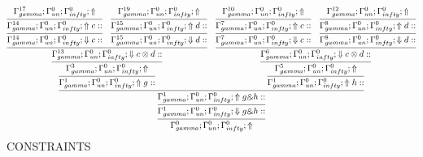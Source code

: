 \documentclass[a4paper, 11pt]{article}
\begin{document}
\[
\infer{\Gamma_{ gamma}^{0} ; \Gamma_{un}^{0} ; \Gamma_{ infty}^{0} ;  \Uparrow }
{\infer{\Gamma_{ gamma}^{1} ; \Gamma_{un}^{0} ; \Gamma_{ infty}^{0} ;  \Downarrow g \binampersand h :: }
{\infer{\Gamma_{ gamma}^{1} ; \Gamma_{un}^{0} ; \Gamma_{ infty}^{0} ;  \Uparrow g \binampersand h :: }
{\infer{\Gamma_{ gamma}^{1} ; \Gamma_{un}^{0} ; \Gamma_{ infty}^{0} ;  \Uparrow g :: }
{\infer{\Gamma_{ gamma}^{3} ; \Gamma_{un}^{0} ; \Gamma_{ infty}^{0} ;  \Uparrow }
{\infer{\Gamma_{ gamma}^{13} ; \Gamma_{un}^{0} ; \Gamma_{ infty}^{0} ;  \Downarrow c \otimes d :: }
{\infer{\Gamma_{ gamma}^{14} ; \Gamma_{un}^{0} ; \Gamma_{ infty}^{0} ;  \Downarrow c :: }
{\infer{\Gamma_{ gamma}^{14} ; \Gamma_{un}^{0} ; \Gamma_{ infty}^{0} ;  \Uparrow c :: }
{\Gamma_{ gamma}^{17} ; \Gamma_{un}^{0} ; \Gamma_{ infty}^{0} ;  \Uparrow }}
&
\infer{\Gamma_{ gamma}^{15} ; \Gamma_{un}^{0} ; \Gamma_{ infty}^{0} ;  \Downarrow d :: }
{\infer{\Gamma_{ gamma}^{15} ; \Gamma_{un}^{0} ; \Gamma_{ infty}^{0} ;  \Uparrow d :: }
{\Gamma_{ gamma}^{19} ; \Gamma_{un}^{0} ; \Gamma_{ infty}^{0} ;  \Uparrow }}}}}
&
\infer{\Gamma_{ gamma}^{1} ; \Gamma_{un}^{0} ; \Gamma_{ infty}^{0} ;  \Uparrow h :: }
{\infer{\Gamma_{ gamma}^{5} ; \Gamma_{un}^{0} ; \Gamma_{ infty}^{0} ;  \Uparrow }
{\infer{\Gamma_{ gamma}^{6} ; \Gamma_{un}^{0} ; \Gamma_{ infty}^{0} ;  \Downarrow c \otimes d :: }
{\infer{\Gamma_{ gamma}^{7} ; \Gamma_{un}^{0} ; \Gamma_{ infty}^{0} ;  \Downarrow c :: }
{\infer{\Gamma_{ gamma}^{7} ; \Gamma_{un}^{0} ; \Gamma_{ infty}^{0} ;  \Uparrow c :: }
{\Gamma_{ gamma}^{10} ; \Gamma_{un}^{0} ; \Gamma_{ infty}^{0} ;  \Uparrow }}
&
\infer{\Gamma_{ gamma}^{8} ; \Gamma_{un}^{0} ; \Gamma_{ infty}^{0} ;  \Downarrow d :: }
{\infer{\Gamma_{ gamma}^{8} ; \Gamma_{un}^{0} ; \Gamma_{ infty}^{0} ;  \Uparrow d :: }
{\Gamma_{ gamma}^{12} ; \Gamma_{un}^{0} ; \Gamma_{ infty}^{0} ;  \Uparrow }}}}}}}}
\]
CONSTRAINTS
\end{document}
